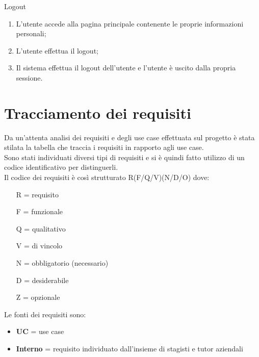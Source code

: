 \begin{usecase}{12}{Logout}\label{uc:logout}
  \usecasemain{}
  
  \begin{enumerate}
    \item L'utente accede alla pagina principale contenente le proprie informazioni personali;
    \item L'utente effettua il logout;
    \item Il sistema effettua il logout dell'utente e l'utente è uscito dalla propria sessione.
  \end{enumerate}
\end{usecase}

\section{Tracciamento dei requisiti}

Da un'attenta analisi dei requisiti e degli use case effettuata sul progetto è stata stilata la tabella che traccia i requisiti in rapporto agli use case.\\
Sono stati individuati diversi tipi di requisiti e si è quindi fatto utilizzo di un codice identificativo per distinguerli.\\
Il codice dei requisiti è così strutturato R(F/Q/V)(N/D/O) dove:
\begin{enumerate}
	\item[R =] requisito
    \item[F =] funzionale
    \item[Q =] qualitativo
    \item[V =] di vincolo
    \item[N =] obbligatorio (necessario)
    \item[D =] desiderabile
    \item[Z =] opzionale
\end{enumerate}

Le fonti dei requisiti sono:
\begin{itemize}
  \item \textbf{UC} = use case
  \item \textbf{Interno} = requisito individuato dall'insieme di stagisti e tutor aziendali
\end{itemize}

